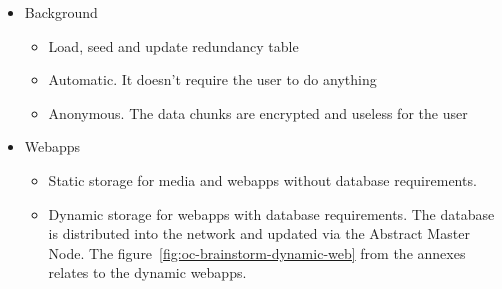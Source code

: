 \begin{itemize}
\item Background
\begin{itemize}
\item Load, seed and update redundancy table
\item Automatic. It doesn't require the user to do anything
\item Anonymous. The data chunks are encrypted and useless for the user
\end{itemize}
\end{itemize}

\begin{itemize}
\item Webapps
\begin{itemize}
\item Static storage for media and webapps without database requirements.
\item Dynamic storage for webapps with database requirements. The database is distributed into the network and updated via the Abstract Master Node. The figure~\ref{fig:oc-brainstorm-dynamic-web} from the annexes relates to the dynamic webapps.
\end{itemize}
\end{itemize}


